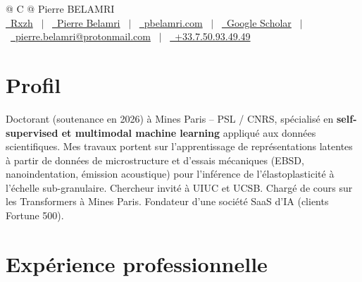\documentclass[a4paper,11pt]{article}
\begin{document}
\pagestyle{empty}

\begin{tabularx}{\linewidth}{@{} C @{}}
\Huge{Pierre BELAMRI} \\[2pt]
\small{
\href{https://github.com/Rxzh}{\raisebox{-0.05\height}\faGithub\ Rxzh} \ $|$ \
\href{https://linkedin.com/in/pierre-r-belamri-4a8484191}{\raisebox{-0.05\height}\faLinkedin\ Pierre Belamri} \ $|$ \
\href{https://pbelamri.com}{\raisebox{-0.05\height}\faGlobe\ pbelamri.com} \ $|$ \
\href{https://scholar.google.com/citations?user=8xd25vsAAAAJ&hl=en&oi=ao}{\raisebox{-0.05\height}\faGraduationCap\ Google Scholar} \ $|$ \
\href{mailto:pierre.belamri@protonmail.com}{\raisebox{-0.05\height}\faEnvelope\ pierre.belamri@protonmail.com} \ $|$ \
\href{tel:+33750934949}{\raisebox{-0.05\height}\faMobile\ +33.7.50.93.49.49}
}
\end{tabularx}

\vspace{-2pt}
\section{Profil}
\vspace{1pt}
{\small Doctorant (soutenance en 2026) à Mines Paris -- PSL / CNRS, spécialisé en \textbf{self-supervised et multimodal machine learning} appliqué aux données scientifiques. Mes travaux portent sur l'apprentissage de représentations latentes à partir de données de microstructure et d'essais mécaniques (EBSD, nanoindentation, émission acoustique) pour l'inférence de l'élastoplasticité à l'échelle sub-granulaire. Chercheur invité à UIUC et UCSB. Chargé de cours sur les Transformers à Mines Paris. Fondateur d'une société SaaS d'IA (clients Fortune 500).}

\section{Expérience professionnelle}
\end{document}

